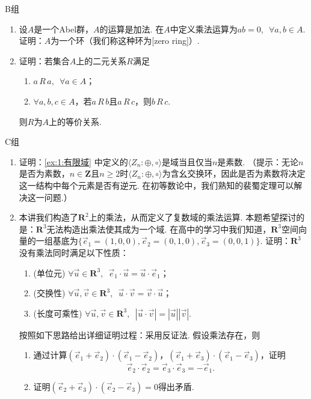 \centerline{\heiti B组}
\begin{enumerate}
    \item 设$A$是一个Abel群，$A$的运算是加法. 在$A$中定义乘法运算为$ab=0,\enspace\forall a,b\in A$. 证明：$A$为一个环（我们称这种环为[zero ring]）.

    \item 证明：若集合$A$上的二元关系$R$满足
          \begin{enumerate}
              \item $a\,R\,a,\enspace\forall a\in A$；

              \item $\forall a,b,c\in A$，若$a\,R\,b$且$a\,R\,c$，则$b\,R\,c$.
          \end{enumerate}
          则$R$为$A$上的等价关系.
\end{enumerate}

\centerline{\heiti C组}
\begin{enumerate}
    \item 证明：\autoref{ex:1:有限域} 中定义的$\langle Z_n:\oplus,\circ\rangle$是域当且仅当$n$是素数.
          （提示：无论$n$是否为素数，$n\in\mathbf{Z}$且$n\geqslant 2$时$\langle Z_n:\oplus,\circ\rangle$为含幺交换环，因此是否为素数将决定这一结构中每个元素是否有逆元. 在初等数论中，我们熟知的裴蜀定理可以解决这一问题.）

    \item 本讲我们构造了$\mathbf{R}^2$上的乘法，从而定义了复数域的乘法运算. 本题希望探讨的是：$\mathbf{R}^3$无法构造出乘法使其成为一个域. 在高中的学习中我们知道，$\mathbf{R}^3$空间向量的一组基底为$\{\vec{e}_1=(1,0,0),\vec{e}_2=(0,1,0),\vec{e}_3=(0,0,1)\}$. 证明：$\mathbf{R}^3$没有乘法同时满足以下性质：
          \begin{enumerate}
              \item (单位元) $\forall \vec{u}\in\mathbf{R}^3,\enspace\vec{e}_1\cdot \vec{u}=\vec{u}\cdot \vec{e}_1$；

              \item (交换性) $\forall \vec{u},\vec{v}\in\mathbf{R}^3,\enspace\vec{u}\cdot \vec{v}=\vec{v}\cdot \vec{u}$；

              \item (长度可乘性) $\forall \vec{u},\vec{v}\in\mathbf{R}^3,\enspace|\vec{u}\cdot\vec{v}|=|\vec{u}||\vec{v}|$.
          \end{enumerate}
          按照如下思路给出详细证明过程：采用反证法. 假设乘法存在，则
          \begin{enumerate}
              \item 通过计算$(\vec{e}_1+\vec{e}_2)\cdot(\vec{e}_1-\vec{e}_2)$，$(\vec{e}_1+\vec{e}_3)\cdot(\vec{e}_1-\vec{e}_3)$，证明\[\vec{e}_2\cdot\vec{e}_2=\vec{e}_3\cdot\vec{e}_3=-\vec{e}_1.\]

              \item 证明$(\vec{e}_2+\vec{e}_3)\cdot(\vec{e}_2-\vec{e}_3)=0$得出矛盾.
          \end{enumerate}
\end{enumerate}
